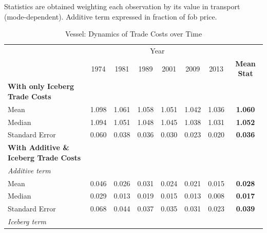 \documentclass[a4paper,11pt]{article}
\begin{document}
\begin{table}[htbp]
\begin{center}
\begin{tabular}{lccccccc}
\hline\hline
    \end{tabular}%
  \end{center}
  \label{tab:result_air_rob}%
\tiny{Statistics are obtained weighting each observation by its value in transport (mode-dependent). Additive term expressed in fraction of fob price. }
\end{table}%


\begin{table}[htbp]
\def\sym#1{\ifmmode^{#1}\else\(^{#1}\)\fi}
  \centering
\caption{Vessel: Dynamics of Trade Costs over Time}
\begin{center}
    \begin{tabular}{lccccccc}
   \hline\hline
          & \multicolumn{6}{c}{Year}                      &  \\
& 1974  & 1981  & 1989  & 2001  & 2009  & 2013  & \textbf{Mean Stat}\\
\hline
\textbf{With only Iceberg Trade Costs} &       &       &       &       &       &       & \textbf{} \\
Mean  & 1.098 & 1.061 & \multicolumn{1}{c}{1.058} & \multicolumn{1}{c}{1.051} & \multicolumn{1}{c}{1.042} & \multicolumn{1}{c}{1.036} & \textbf{1.060} \\
Median & 1.094 & 1.051 & \multicolumn{1}{c}{1.048} & \multicolumn{1}{c}{1.045} & \multicolumn{1}{c}{1.038} & \multicolumn{1}{c}{1.031} & \textbf{1.052} \\
Standard Error & 0.060 & 0.038 & \multicolumn{1}{c}{0.036} & \multicolumn{1}{c}{0.030} & \multicolumn{1}{c}{0.023} & \multicolumn{1}{c}{0.020} & \textbf{0.036} \\
\hline
\textbf{With Additive \& Iceberg Trade Costs } &       &       &       &       &       &       & \textbf{}\\
\textit{Additive term} &       &       &       &       &       &       & \textbf{} \\
Mean  & 0.046 & 0.026 & \multicolumn{1}{c}{0.031} & \multicolumn{1}{c}{0.024} & \multicolumn{1}{c}{0.021} & \multicolumn{1}{c}{0.015} & \textbf{0.028} \\
Median & 0.029 & 0.013 & \multicolumn{1}{c}{0.019} & \multicolumn{1}{c}{0.015} & \multicolumn{1}{c}{0.013} & \multicolumn{1}{c}{0.008} & \textbf{0.017} \\
Standard Error & 0.068 & 0.044 & \multicolumn{1}{c}{0.037} & \multicolumn{1}{c}{0.035} & \multicolumn{1}{c}{0.031} & \multicolumn{1}{c}{0.023} & \textbf{0.039} \\
\textit{Iceberg term} &       &       &       &       &       &       & \textbf{} \\

\end{tabular}
\end{center}
\end{table}
\end{document}
